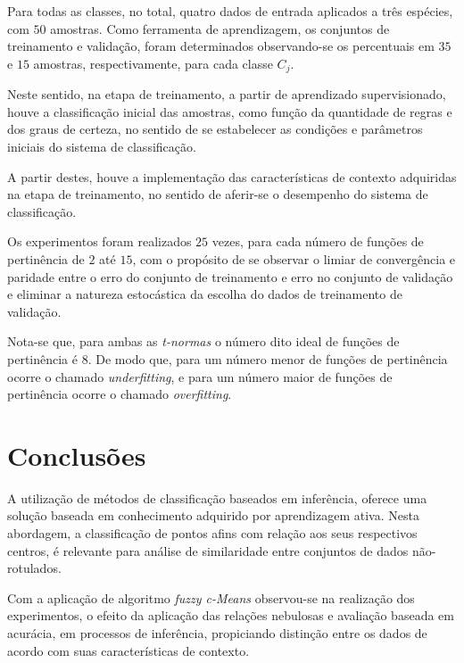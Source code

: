 \documentclass[12pt,a4paper]{article}
\numberwithin{equation}{section}
\begin{document}
Para todas as classes, no total, quatro dados de entrada aplicados a três espécies, com $50$ amostras. Como ferramenta de aprendizagem, os conjuntos de treinamento e validação, foram determinados observando-se os percentuais em $35$ e $15$ amostras, respectivamente, para cada classe $C_{j}$.

Neste sentido, na etapa de treinamento, a partir de aprendizado supervisionado, houve a classificação inicial das amostras, como função da quantidade de regras e dos graus de certeza, no sentido de se estabelecer as condições e parâmetros iniciais do sistema de classificação.

A partir destes, houve a implementação das características de contexto adquiridas na etapa de treinamento, no sentido de aferir-se o desempenho do sistema de classificação.

Os experimentos foram realizados $25$ vezes, para cada número de funções de pertinência de $2$ até $15$, com o propósito de se observar o limiar de convergência e paridade entre o erro do conjunto de treinamento e erro no conjunto de validação e eliminar a natureza estocástica da escolha do dados de treinamento de validação.

Nota-se que, para ambas as \textit{t-normas} o número dito ideal de funções de pertinência é $8$. De modo que, para um número menor de funções de pertinência ocorre o chamado \textit{underfitting}, e para um número maior de funções de pertinência ocorre o chamado \textit{overfitting}.


\newpage
\section{Conclusões}

A utilização de métodos de classificação baseados em inferência, oferece uma solução baseada em conhecimento adquirido por aprendizagem ativa. Nesta abordagem, a classificação de pontos afins com relação aos seus respectivos centros, é relevante para análise de similaridade entre conjuntos de dados não-rotulados. 

\noindent Com a aplicação de algoritmo \textit{fuzzy c-Means} observou-se na realização dos experimentos, o efeito da aplicação das relações nebulosas e avaliação baseada em acurácia, em processos de inferência, propiciando distinção entre os dados de acordo com suas características de contexto.
\end{document}
